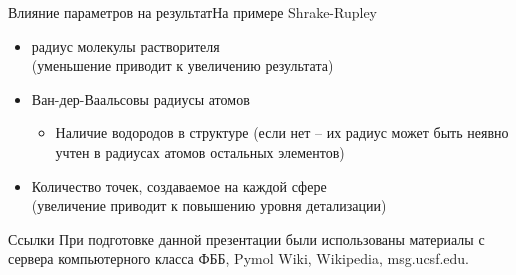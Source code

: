 \documentclass{beamer}
\begin{document}
    \begin{frame}{Влияние параметров на результат}{На примере Shrake-Rupley}
        \begin{itemize}
            \item радиус молекулы растворителя \\
                (уменьшение приводит к увеличению результата)
            \item Ван-дер-Ваальсовы радиусы атомов
                \begin{itemize}
                \item Наличие водородов в структуре (если нет -- их радиус может
                    быть неявно учтен в радиусах атомов остальных элементов)
                \end{itemize}
            \item Количество точек, создаваемое на каждой сфере \\
                (увеличение приводит к повышению уровня детализации)
        \end{itemize}
    \end{frame}

    \begin{frame}{Ссылки}
        При подготовке данной презентации были использованы материалы с
        сервера компьютерного класса ФББ, Pymol Wiki, Wikipedia, msg.ucsf.edu.
    \end{frame}
\end{document}
